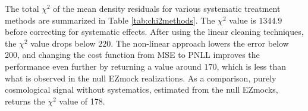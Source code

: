 The total $\chi^{2}$ of the mean density residuals for various systematic treatment methods are summarized in Table \ref{tab:chi2methods}. The $\chi^{2}$ value is $1344.9$ before correcting for systematic effects. After using the linear cleaning techniques, the $\chi^{2}$ value drops below $220$. The non-linear approach lowers the error below 200, and changing the cost function from MSE to PNLL improves the performance even further by returning a value around $170$, which is less than what is observed in the null EZmock realizations. As a comparison, purely cosmological signal without systematics, estimated from the null EZmocks, returns the $\chi^{2}$ value of 178.

\begin{table}
    \centering
    \caption[Total chi-squared value of eBOSS quasars for various methods.]{Total $\chi^{2}$ of the mean density residuals of the main sample in the NGC after various mitigation configurations. The chi-squared value before accounting for imaging systematics is $1344.9$, which is much larger than the 95-th quantile observed in the null EZmocks, i.e., $178$.}
    \label{tab:chi2methods}
\end{table}


